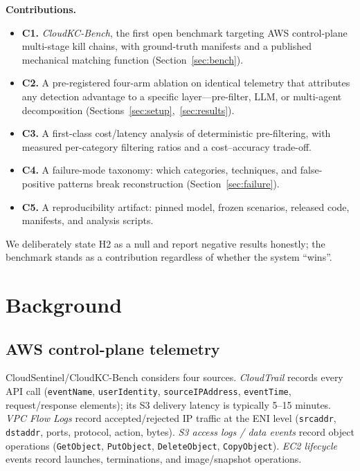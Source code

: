 \documentclass[journal]{IEEEtran}
\begin{document}
\textbf{Contributions.}
\begin{itemize}
\item \textbf{C1.} \emph{CloudKC-Bench}, the first open benchmark targeting AWS
control-plane multi-stage kill chains, with ground-truth manifests and a published
mechanical matching function (Section~\ref{sec:bench}).
\item \textbf{C2.} A pre-registered four-arm ablation on identical telemetry that
attributes any detection advantage to a specific layer---pre-filter, LLM, or
multi-agent decomposition (Sections~\ref{sec:setup},~\ref{sec:results}).
\item \textbf{C3.} A first-class cost/latency analysis of deterministic pre-filtering,
with measured per-category filtering ratios and a cost--accuracy trade-off.
\item \textbf{C4.} A failure-mode taxonomy: which categories, techniques, and
false-positive patterns break reconstruction (Section~\ref{sec:failure}).
\item \textbf{C5.} A reproducibility artifact: pinned model, frozen scenarios, released
code, manifests, and analysis scripts.
\end{itemize}
We deliberately state H2 as a null and report negative results honestly; the benchmark
stands as a contribution regardless of whether the system ``wins''.

\section{Background}\label{sec:background}
\subsection{AWS control-plane telemetry}
CloudSentinel/CloudKC-Bench considers four sources. \emph{CloudTrail} records every
API call (\texttt{eventName}, \texttt{userIdentity}, \texttt{sourceIPAddress},
\texttt{eventTime}, request/response elements); its S3 delivery latency is typically
5--15 minutes. \emph{VPC Flow Logs} record accepted/rejected IP traffic at the ENI
level (\texttt{srcaddr}, \texttt{dstaddr}, ports, protocol, action, bytes).
\emph{S3 access logs / data events} record object operations (\texttt{GetObject},
\texttt{PutObject}, \texttt{DeleteObject}, \texttt{CopyObject}). \emph{EC2 lifecycle}
events record launches, terminations, and image/snapshot operations.
\end{document}
